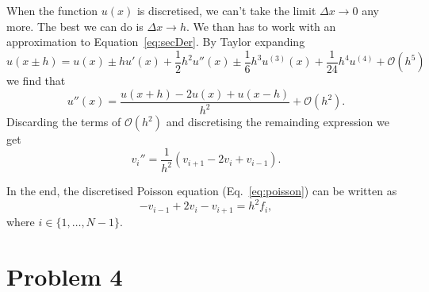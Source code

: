 \documentclass[english,notitlepage,aps,pra,10pt]{revtex4-2}
\begin{document}
When the function $u(x)$ is discretised, we can't take the limit $\Delta x \to 0$ any more. The best we can do is $\Delta x \to h$. We than has to work with an approximation to Equation~\ref{eq:secDer}. By Taylor expanding 
\begin{equation}
    u(x \pm h) = u(x) \pm h u'(x) + \frac{1}{2} h^2 u''(x) \pm \frac{1}{6} h^3 u^{(3)}(x) + \frac{1}{24} h^4 u^{(4)} + \mathcal{O}(h^5)
\end{equation}
we find that 
\begin{equation}
    u''(x) = \frac{u(x+h) - 2u(x) + u(x-h)}{h^2} + \mathcal{O}(h^2).
\end{equation}
Discarding the terms of $\mathcal{O}(h^2)$ and discretising the remainding expression we get
\begin{equation}
    v_i'' = \frac{1}{h^2}(v_{i+1} - 2v_i + v_{i-1}).
\end{equation}

In the end, the discretised Poisson equation (Eq.~\ref{eq:poisson}) can be written as
\begin{equation}
    -v_{i-1} + 2v_i - v_{i+1} = h^2 f_i,
    \label{eq:discPoisson}
\end{equation} 
where $i \in \{1,\dots, N-1\}$.

\section*{Problem 4}
\end{document}
